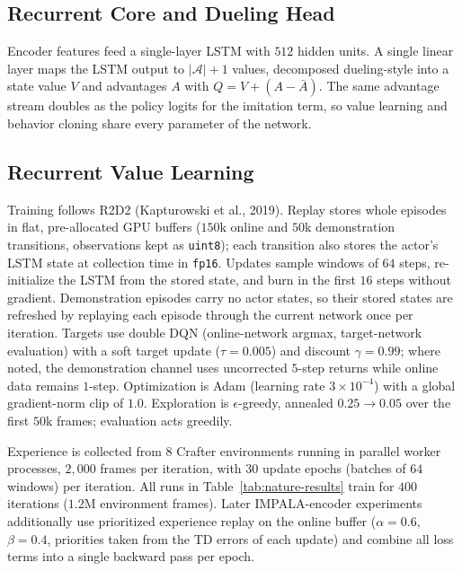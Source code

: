 \subsection{Recurrent Core and Dueling Head}

Encoder features feed a single-layer LSTM with $512$ hidden units. A single
linear layer maps the LSTM output to $|\mathcal{A}|{+}1$ values, decomposed
dueling-style into a state value $V$ and advantages $A$ with
$Q = V + (A - \bar{A})$. The same advantage stream doubles as the policy
logits for the imitation term, so value learning and behavior cloning share
every parameter of the network.

\subsection{Recurrent Value Learning}

Training follows R2D2 (Kapturowski et al., 2019). Replay stores whole
episodes in flat, pre-allocated GPU buffers ($150$k online and $50$k
demonstration transitions, observations kept as \texttt{uint8}); each
transition also stores the actor's LSTM state at collection time in
\texttt{fp16}. Updates sample windows of $64$ steps, re-initialize the LSTM
from the stored state, and burn in the first $16$ steps without gradient.
Demonstration episodes carry no actor states, so their stored states are
refreshed by replaying each episode through the current network once per
iteration. Targets use double DQN (online-network argmax, target-network
evaluation) with a soft target update ($\tau = 0.005$) and discount
$\gamma = 0.99$; where noted, the demonstration channel uses uncorrected
$5$-step returns while online data remains $1$-step. Optimization is Adam
(learning rate $3{\times}10^{-4}$) with a global gradient-norm clip of
$1.0$. Exploration is $\epsilon$-greedy, annealed $0.25 \rightarrow 0.05$
over the first $50$k frames; evaluation acts greedily.

Experience is collected from $8$ Crafter environments running in parallel
worker processes, $2{,}000$ frames per iteration, with $30$ update epochs
(batches of $64$ windows) per iteration. All runs in
Table~\ref{tab:nature-results} train for $400$ iterations ($1.2$M
environment frames). Later IMPALA-encoder experiments additionally use
prioritized experience replay on the online buffer ($\alpha{=}0.6$,
$\beta{=}0.4$, priorities taken from the TD errors of each update) and
combine all loss terms into a single backward pass per epoch.

